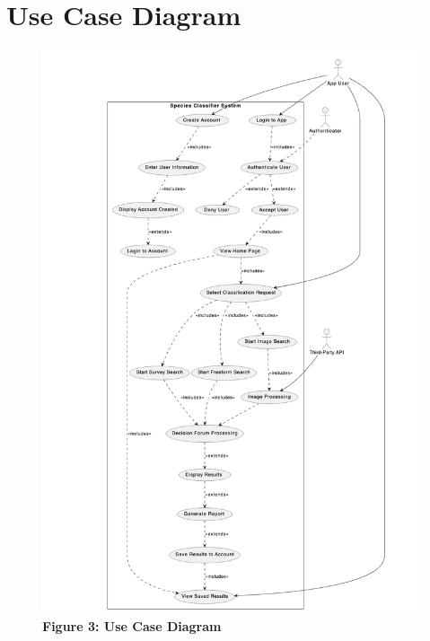 \documentclass[]{article}
\begin{document}
\section{Use Case Diagram}
\begin{figure}[H]
    \centering
    \includegraphics[width=1\textwidth, height=1.2\textwidth]{3Diagram.png}
    \caption*{\textbf{Figure 3: Use Case Diagram}}
\end{figure}

\end{document}
